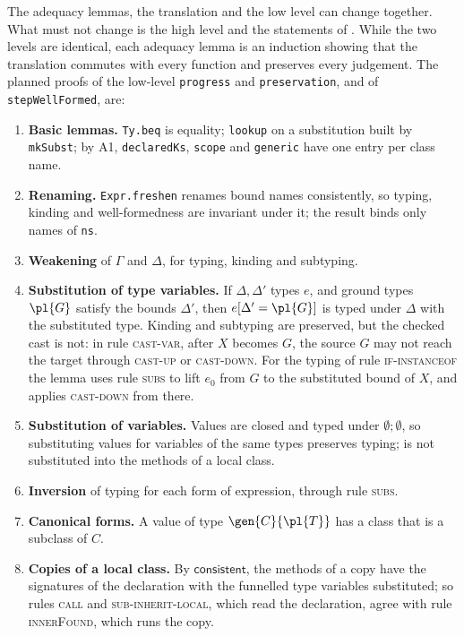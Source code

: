The adequacy lemmas, the translation and the low level can change together.
What must not change is the high level and the statements of .
While the two levels are identical, each adequacy lemma is an induction showing that the translation commutes with every function and preserves every judgement.
The planned proofs of the low-level \texttt{progress} and \texttt{preservation}, and of \texttt{stepWellFormed}, are:
\begin{enumerate}
\item \textbf{Basic lemmas.} \texttt{Ty.beq} is equality; \texttt{lookup} on a substitution built by \texttt{mkSubst}; by A1, \texttt{declaredKs}, \texttt{scope} and \texttt{generic} have one entry per class name.
\item \textbf{Renaming.} \texttt{Expr.freshen} renames bound names consistently, so typing, kinding and well-formedness are invariant under it; the result binds only names of \texttt{ns}.
\item \textbf{Weakening} of $\Gamma$ and $\Delta$, for typing, kinding and subtyping.
\item \textbf{Substitution of type variables.} If $\Delta,\Delta'$ types $e$, and ground types $\pl{G}$ satisfy the bounds $\Delta'$, then $e[\Delta'=\pl{G}]$ is typed under $\Delta$ with the substituted type.
Kinding and subtyping are preserved, but the checked cast is not: in rule \textsc{cast-var}, after $X$ becomes $G$, the source $G$ may not reach the target through \textsc{cast-up} or \textsc{cast-down}.
For the typing of rule \textsc{if-instanceof} the lemma uses rule \textsc{subs} to lift $e_0$ from $G$ to the substituted bound of $X$, and applies \textsc{cast-down} from there.
\item \textbf{Substitution of variables.} Values are closed and typed under $\emptyset;\emptyset$, so substituting values for variables of the same types preserves typing; \Q@this@ is not substituted into the methods of a local class.
\item \textbf{Inversion} of typing for each form of expression, through rule \textsc{subs}.
\item \textbf{Canonical forms.} A value of type $\gen{C}{\pl{T}}$ has a class that is a subclass of $C$.
\item \textbf{Copies of a local class.} By $\mathsf{consistent}$, the methods of a copy have the signatures of the declaration with the funnelled type variables substituted; so rules \textsc{call} and \textsc{sub-inherit-local}, which read the declaration, agree with rule \textsc{innerFound}, which runs the copy.

\end{enumerate}
